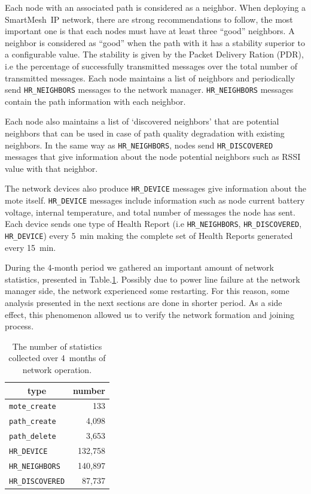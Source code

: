 \documentclass{sig-alternate}
\newcommand{\smip}           {SmartMesh~IP\xspace}
\newcommand{\HRNEIGHBORS}    {{\tt HR\_NEIGHBORS}\xspace}
\newcommand{\HRDISCOVERED}   {{\tt HR\_DISCOVERED}\xspace}
\newcommand{\HRDEVICE}       {{\tt HR\_DEVICE}\xspace}
\newcommand{\pathcreate}     {{\tt path\_create}\xspace}
\newcommand{\pathdelete}     {{\tt path\_delete}\xspace}
\newcommand{\motecreate}     {{\tt mote\_create}\xspace}
\newcommand{\HRNEIGHBORSTOTALNUMBER}     {140,897}
\begin{document}

Each node with an associated path is considered as a neighbor.
When deploying a \smip network, there are strong recommendations to follow, the most important one is that each nodes must have at least three ``good'' neighbors.
A neighbor is considered as ``good'' when the path with it has a stability superior to a configurable value.
The stability is given by the Packet Delivery Ration (PDR), i.e the percentage of successfully transmitted messages over the total number of transmitted messages.
Each node maintains a list of neighbors and periodically send \HRNEIGHBORS messages to the network manager.
\HRNEIGHBORS messages contain the path information with each neighbor.


Each node also maintains a list of `discovered neighbors' that are potential neighbors that can be used in case of path quality degradation with existing neighbors.
In the same way as \HRNEIGHBORS, nodes send \HRDISCOVERED messages that give information about the node potential neighbors such as RSSI value with that neighbor.


The network devices also produce \HRDEVICE messages give information about the mote itself.
\HRDEVICE messages include information such as node current battery voltage, internal temperature, and total number of messages the node has sent.
Each device sends one type of Health Report (i.e \HRNEIGHBORS, \HRDISCOVERED, \HRDEVICE) every 5~min making the complete set of Health Reports generated every 15~min.


During the 4-month period we gathered an important amount of network statistics, presented in Table.\ref{tab:msg_stats}.
Possibly due to power line failure at the network manager side, the network experienced some restarting.
For this reason, some analysis presented in the next sections are done in shorter period.
As a side effect, this phenomenon allowed us to verify the network formation and joining process.

\begin{table}
    \centering
    \begin{tabular}{|l|r|}
        \hline
        \multicolumn{1}{|c|}{type} & \multicolumn{1}{|c|}{number} \\ \hline
        \hline
        \motecreate     &     133 \\ \hline
        \pathcreate     &   4,098 \\ \hline
        \pathdelete     &   3,653 \\ \hline
        \HRDEVICE       & 132,758 \\ \hline
        \HRNEIGHBORS    & \HRNEIGHBORSTOTALNUMBER \\ \hline
        \HRDISCOVERED   &  87,737 \\ \hline
    \end{tabular}
    \caption{The number of statistics collected over 4~months of network operation.}
    \label{tab:msg_stats}
\end{table}
\end{document}
